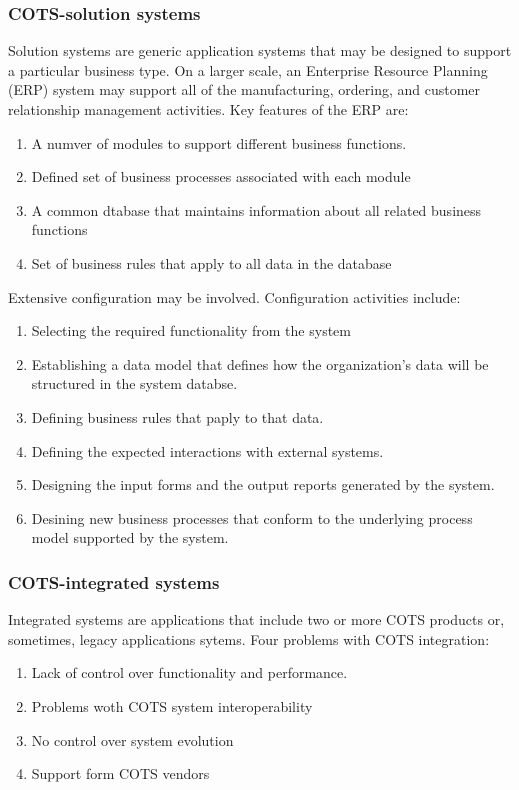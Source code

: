 \documentclass{article}
\begin{document}
\subsubsection{COTS-solution systems}
Solution systems are generic application systems that may be designed to support a particular business type.  On a larger scale, an Enterprise Resource Planning (ERP) system may support all of the manufacturing, ordering, and customer relationship management activities.  Key features of the ERP are:
\begin{enumerate}
\item A numver of modules to support different business functions.
\item Defined set of business processes associated with each module
\item A common dtabase that maintains information about all related business functions
\item Set of business rules that apply to all data in the database
\end{enumerate}

Extensive configuration may be involved.  Configuration activities include:
\begin{enumerate}
\item Selecting the required functionality from the system
\item Establishing a data model that defines how the organization's data will be structured in the system databse.
\item Defining business rules that paply to that data.
\item Defining the expected interactions with external systems.
\item Designing the input forms and the output reports generated by the system.
\item Desining new business processes that conform to the underlying process model supported by the system.
\end{enumerate}

\subsubsection{COTS-integrated systems}
Integrated systems are applications that include two or more COTS products or, sometimes, legacy applications sytems.  
Four problems with COTS integration:
\begin{enumerate}
\item Lack of control over functionality and performance.
\item Problems woth COTS system interoperability
\item No control over system evolution
\item Support form COTS vendors
\end{enumerate}
\end{document}
